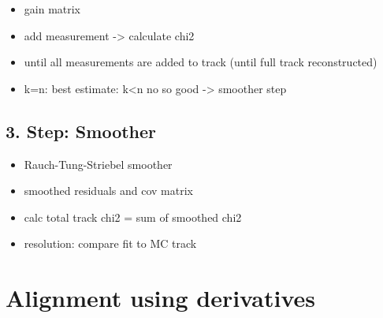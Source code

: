 \begin{itemize}
  \item gain matrix
  \item add measurement -> calculate chi2
  \item until all measurements are added to track (until full track reconstructed)
  \item k=n: best estimate: k<n no so good -> smoother step
\end{itemize}

\subsection{3. Step: Smoother}
\begin{itemize}
  \item Rauch-Tung-Striebel smoother
  \item smoothed residuals and cov matrix
  \item calc total track chi2 = sum of smoothed chi2
  \item resolution: compare fit to MC track
\end{itemize}

\section{Alignment using derivatives}
\label{sec:derivatives}







%
%
%
%

